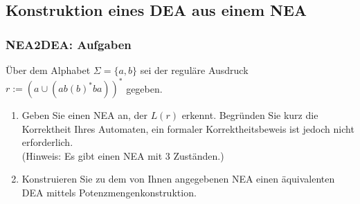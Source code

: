 \documentclass{beamer}
\begin{document}
\subsection{Konstruktion eines DEA aus einem NEA}
\begin{frame}
  \frametitle{NEA2DEA: Aufgaben}
  Über dem Alphabet $\Sigma = \{a,b\}$ sei der reguläre
  Ausdruck
  $r := {(a \cup (ab (b)^* ba))^*}$
  gegeben.
  \begin{enumerate}
    \setlength{\itemsep}{0ex}
  \item Geben Sie einen NEA an, der $L(r)$ erkennt. Begründen Sie
    kurz die Korrektheit Ihres Automaten, ein formaler
    Korrektheitsbeweis ist jedoch nicht erforderlich.\\
    (Hinweis: Es gibt einen NEA mit 3 Zuständen.)
  \item Konstruieren Sie zu dem von Ihnen angegebenen NEA einen
    äquivalenten DEA mittels Potenzmengenkonstruktion.
  \end{enumerate}
\end{frame}
\end{document}
